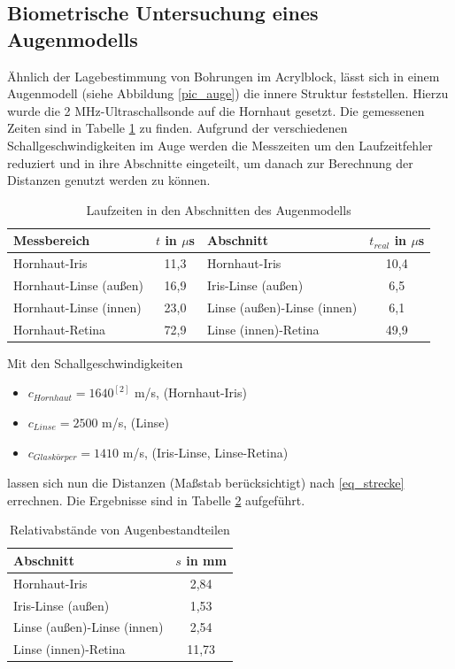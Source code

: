 \subsection{Biometrische Untersuchung eines Augenmodells}
\label{sec_auge}
Ähnlich der Lagebestimmung von Bohrungen im Acrylblock, lässt sich in einem Augenmodell (siehe Abbildung \ref{pic_auge}) die innere
Struktur feststellen. Hierzu wurde die 2 MHz-Ultraschallsonde auf die Hornhaut gesetzt. Die gemessenen Zeiten sind in Tabelle \ref{tab_auge}
zu finden. Aufgrund der verschiedenen Schallgeschwindigkeiten im Auge werden die Messzeiten um den Laufzeitfehler reduziert und in ihre
Abschnitte eingeteilt, um danach zur Berechnung der Distanzen genutzt werden zu können.

\begin{table}[H]
\begin{tabular}{l|c|l|c}
Messbereich & $t$ in $\mu$s & Abschnitt & $t_{real}$ in $\mu$s \\
\hline
Hornhaut-Iris &	11,3	 &Hornhaut-Iris &	10,4\\
Hornhaut-Linse (außen) &	16,9	 &Iris-Linse (außen) &	6,5\\
Hornhaut-Linse (innen)	 &23,0	 &Linse (außen)-Linse (innen) &	6,1\\
Hornhaut-Retina &	72,9	 &Linse (innen)-Retina &	49,9
\end{tabular}
\caption{Laufzeiten in den Abschnitten des Augenmodells}
\label{tab_auge}
\end{table}

Mit den Schallgeschwindigkeiten
\begin{itemize}
 \item $c_{Hornhaut} = 1640^{[2]}$ m/s, \hspace{2cm}(Hornhaut-Iris)
 \item $c_{Linse} = 2500$ m/s, \hspace{2.6cm}(Linse)
 \item $c_{Glaskörper} = 1410$ m/s, \hspace{2cm}(Iris-Linse, Linse-Retina)
\end{itemize}
lassen sich nun die Distanzen (Maßstab berücksichtigt) nach \eqref{eq_strecke} errechnen. Die Ergebnisse sind in Tabelle 
\ref{tab_abmessung} aufgeführt.

\begin{table}[H]
 \begin{tabular}{l|c}
  Abschnitt & $s$ in mm\\
  \hline
Hornhaut-Iris	&2,84\\
Iris-Linse (außen)&	1,53\\
Linse (außen)-Linse (innen)&	2,54\\
Linse (innen)-Retina&	11,73
 \end{tabular}
\caption{Relativabstände von Augenbestandteilen}
\label{tab_abmessung}
\end{table}


